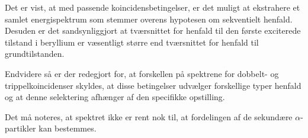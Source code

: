 Det er vist, at med passende koincidensbetingelser, er det muligt at ekstrahere et samlet
energispektrum som stemmer overens hypotesen om sekventielt henfald.  Desuden er det sandsynliggjort
at tværsnittet for henfald til den første exciterede tilstand i beryllium er væsentligt større end
tværsnittet for henfald til grundtilstanden.

Endvidere så er der redegjort for, at forskellen på spektrene for dobbelt- og
trippelkoincidenser skyldes, at disse betingelser udvælger forskellige typer henfald og at denne
selektering afhænger af den specifikke opstilling.

Det må noteres, at spektret ikke er rent nok
til, at fordelingen af de sekundære $\alpha$-partikler kan bestemmes.
